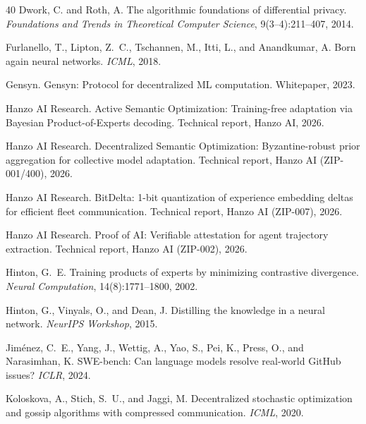 \begin{thebibliography}{40}
Dwork, C. and Roth, A.
\newblock The algorithmic foundations of differential privacy.
\newblock \emph{Foundations and Trends in Theoretical Computer Science},
  9(3--4):211--407, 2014.

Furlanello, T., Lipton, Z.~C., Tschannen, M., Itti, L., and Anandkumar, A.
\newblock Born again neural networks.
\newblock \emph{ICML}, 2018.

Gensyn.
\newblock Gensyn: Protocol for decentralized ML computation.
\newblock Whitepaper, 2023.

Hanzo AI Research.
\newblock Active Semantic Optimization: Training-free adaptation via Bayesian
  Product-of-Experts decoding.
\newblock Technical report, Hanzo AI, 2026.

Hanzo AI Research.
\newblock Decentralized Semantic Optimization: Byzantine-robust prior
  aggregation for collective model adaptation.
\newblock Technical report, Hanzo AI (ZIP-001/400), 2026.

Hanzo AI Research.
\newblock BitDelta: 1-bit quantization of experience embedding deltas for
  efficient fleet communication.
\newblock Technical report, Hanzo AI (ZIP-007), 2026.

Hanzo AI Research.
\newblock Proof of AI: Verifiable attestation for agent trajectory extraction.
\newblock Technical report, Hanzo AI (ZIP-002), 2026.

Hinton, G.~E.
\newblock Training products of experts by minimizing contrastive divergence.
\newblock \emph{Neural Computation}, 14(8):1771--1800, 2002.

Hinton, G., Vinyals, O., and Dean, J.
\newblock Distilling the knowledge in a neural network.
\newblock \emph{NeurIPS Workshop}, 2015.

Jim{\'e}nez, C.~E., Yang, J., Wettig, A., Yao, S., Pei, K., Press, O.,
  and Narasimhan, K.
\newblock SWE-bench: Can language models resolve real-world {GitHub} issues?
\newblock \emph{ICLR}, 2024.

Koloskova, A., Stich, S.~U., and Jaggi, M.
\newblock Decentralized stochastic optimization and gossip algorithms with
  compressed communication.
\newblock \emph{ICML}, 2020.


\end{thebibliography}
